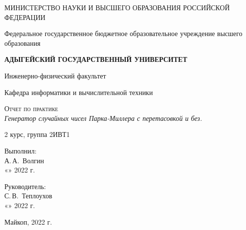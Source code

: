 \documentclass[12pt,a4paper]{scrartcl}
\begin{document}
	\begin{titlepage}
		\begin{center}
			\large
			МИНИСТЕРСТВО НАУКИ И ВЫСШЕГО ОБРАЗОВАНИЯ РОССИЙСКОЙ ФЕДЕРАЦИИ
			
			Федеральное государственное бюджетное образовательное учреждение высшего образования
			
			\textbf{АДЫГЕЙСКИЙ ГОСУДАРСТВЕННЫЙ УНИВЕРСИТЕТ}
			\vspace{0.25cm}
			
			Инженерно-физический факультет
			
			Кафедра информатики и вычислительной техники
			\vfill

			\vfill
			
			\textsc{Отчет по практике}\\[5mm]
			
			{\LARGE \textit{Генератор случайных чисел Парка-Миллера с перетасовкой и без.}}
			\bigskip
			
			2 курс, группа 2ИВТ1
		\end{center}
		\vfill
		
		\newlength{\ML}
		\hfill\begin{minipage}{0.5\textwidth}
			Выполнил:\\
			\underline{\hspace{\ML}} А.\,А.~Волгин\\
			«\underline{\hspace{0.7cm}}» \underline{\hspace{2cm}} 2022 г.
		\end{minipage}%
		\bigskip
		
		\hfill\begin{minipage}{0.5\textwidth}
			Руководитель:\\
			\underline{\hspace{\ML}} С.\,В.~Теплоухов\\
			«\underline{\hspace{0.7cm}}» \underline{\hspace{2cm}} 2022 г.
		\end{minipage}%
		\vfill
		
		\begin{center}
			Майкоп, 2022 г.
		\end{center}
	\end{titlepage}
\end{document}
